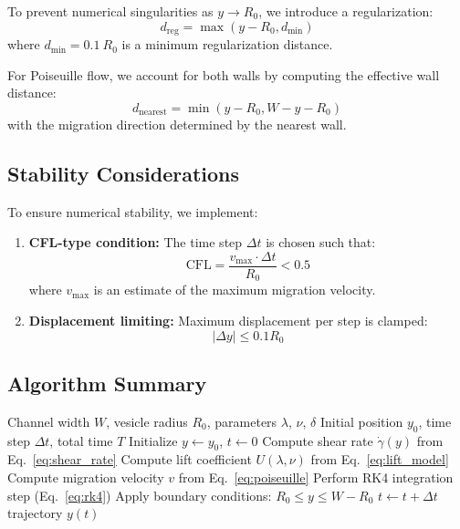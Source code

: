 \documentclass{article}
\begin{document}
To prevent numerical singularities as $y \to R_0$, we introduce a regularization:
\begin{equation}
    d_{\text{reg}} = \max(y - R_0, d_{\min})
\end{equation}
where $d_{\min} = 0.1 \ R_0$ is a minimum regularization distance.

For Poiseuille flow, we account for both walls by computing the effective wall distance:
\begin{equation}
    d_{\text{nearest}} = \min(y - R_0, W - y - R_0)
\end{equation}
with the migration direction determined by the nearest wall.

\subsection{Stability Considerations}

To ensure numerical stability, we implement:
\begin{enumerate}
    \item \textbf{CFL-type condition:} The time step $\Delta t$ is chosen such that:
    \begin{equation}
        \text{CFL} = \frac{v_{\max} \cdot \Delta t}{R_0} < 0.5
    \end{equation}
    where $v_{\max}$ is an estimate of the maximum migration velocity.
    
    \item \textbf{Displacement limiting:} Maximum displacement per step is clamped:
    \begin{equation}
        |\Delta y| \leq 0.1 R_0
    \end{equation}
\end{enumerate}

\subsection{Algorithm Summary}

\begin{algorithm}[H]
\caption{Vesicle Migration Simulation}
\begin{algorithmic}[1]
\Require Channel width $W$, vesicle radius $R_0$, parameters $\lambda$, $\nu$, $\delta$
\Require Initial position $y_0$, time step $\Delta t$, total time $T$
\State Initialize $y \gets y_0$, $t \gets 0$
    \State Compute shear rate $\dot{\gamma}(y)$ from Eq.~\eqref{eq:shear_rate}
    \State Compute lift coefficient $U(\lambda, \nu)$ from Eq.~\eqref{eq:lift_model}
    \State Compute migration velocity $v$ from Eq.~\eqref{eq:poiseuille}
    \State Perform RK4 integration step (Eq.~\eqref{eq:rk4})
    \State Apply boundary conditions: $R_0 \leq y \leq W - R_0$
    \State $t \gets t + \Delta t$
\EndWhile
\State \Return trajectory $y(t)$
\end{algorithmic}
\end{algorithm}
\end{document}
